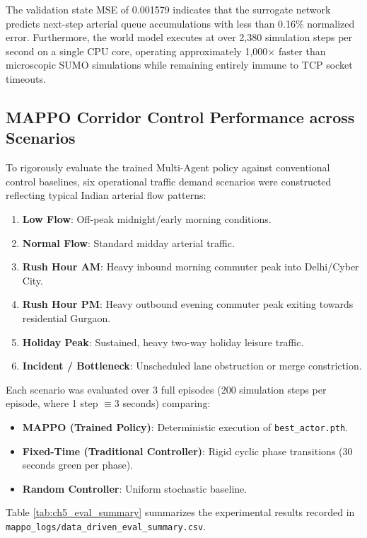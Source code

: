 The validation state MSE of 0.001579 indicates that the surrogate network predicts next-step arterial queue accumulations with less than 0.16\% normalized error. Furthermore, the world model executes at over 2,380 simulation steps per second on a single CPU core, operating approximately 1,000$\times$ faster than microscopic SUMO simulations while remaining entirely immune to TCP socket timeouts.

\subsection{MAPPO Corridor Control Performance across Scenarios}
To rigorously evaluate the trained Multi-Agent policy against conventional control baselines, six operational traffic demand scenarios were constructed reflecting typical Indian arterial flow patterns:
\begin{enumerate}
    \item \textbf{Low Flow}: Off-peak midnight/early morning conditions.
    \item \textbf{Normal Flow}: Standard midday arterial traffic.
    \item \textbf{Rush Hour AM}: Heavy inbound morning commuter peak into Delhi/Cyber City.
    \item \textbf{Rush Hour PM}: Heavy outbound evening commuter peak exiting towards residential Gurgaon.
    \item \textbf{Holiday Peak}: Sustained, heavy two-way holiday leisure traffic.
    \item \textbf{Incident / Bottleneck}: Unscheduled lane obstruction or merge constriction.
\end{enumerate}

Each scenario was evaluated over 3 full episodes (200 simulation steps per episode, where 1 step $\equiv 3$ seconds) comparing:
\begin{itemize}
    \item \textbf{MAPPO (Trained Policy)}: Deterministic execution of \texttt{best\_actor.pth}.
    \item \textbf{Fixed-Time (Traditional Controller)}: Rigid cyclic phase transitions (30 seconds green per phase).
    \item \textbf{Random Controller}: Uniform stochastic baseline.
\end{itemize}

Table \ref{tab:ch5_eval_summary} summarizes the experimental results recorded in \texttt{mappo\_logs/data\_driven\_eval\_summary.csv}.

